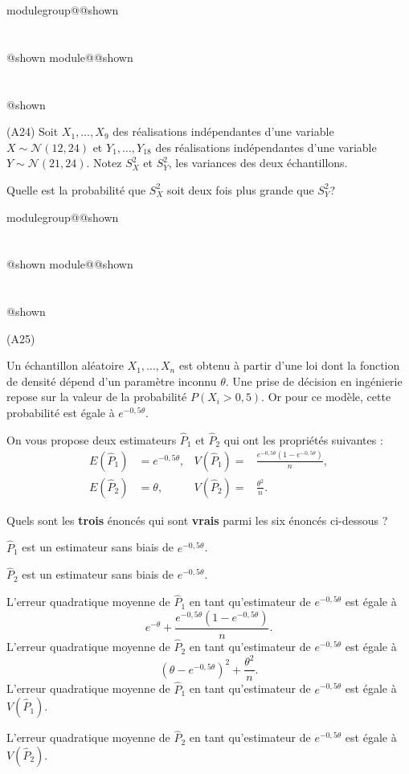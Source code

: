 \documentclass{Evaluation}
\makeatletter
\newcommand{\currentmodulekey}{}
\newcommand{\currentmoduletitle}{}
\newcommand{\currentgroupkey}{}
\newcommand{\currentgrouptitle}{}
\newcommand{\showmoduleifneeded}{%
  \ifx\currentgroupkey\empty\else
    \expandafter\ifx\csname modulegroup@\currentgroupkey @shown\endcsname\relax
      \section*{\currentgrouptitle}%
      \expandafter\gdef\csname modulegroup@\currentgroupkey @shown\endcsname{1}%
    \fi
  \fi
  \expandafter\ifx\csname module@\currentmodulekey @shown\endcsname\relax
    \section*{\currentmoduletitle}%
    \expandafter\gdef\csname module@\currentmodulekey @shown\endcsname{1}%
  \fi
}
\newenvironment{A24}{\showmoduleifneeded}{}
\newenvironment{A25}{\showmoduleifneeded}{}
\makeatother
\begin{document}
\begin{questions}
\begin{A24}
\question (A24)  
Soit $X_1,\hdots,X_9$ des réalisations indépendantes d'une variable $X\sim\mathcal{N}(12, 24)$ et $Y_1,\hdots,Y_{18}$ des réalisations indépendantes d'une variable $Y\sim\mathcal{N}(21, 24)$. 
Notez $S_X^2$ et $S_Y^2$, les variances des deux échantillons.

Quelle est la probabilité que $S_X^2$ soit deux fois plus grande que $S_Y^2$?
\end{A24}

\begin{A25}
\question (A25)

Un échantillon aléatoire $X_1,\dots,X_n$ est obtenu à partir d'une loi dont la fonction
de densité dépend d'un paramètre inconnu $\theta$. Une prise de décision en ingénierie
repose sur la valeur de la probabilité $P(X_i>0,5)$. Or pour ce modèle, 
cette probabilité est égale à $e^{-0,5\theta}$.

On vous propose deux estimateurs $\hat{P}_1$ et $\hat{P}_2$ qui ont les propriétés suivantes :
\begin{align*}
    E(\hat{P}_1)&= e^{-0,5\theta},&  V(\hat{P}_1) =& \frac{e^{-0,5\theta}\left(1-e^{-0,5\theta}\right)}{n}, \\
    E(\hat{P}_2) &= \theta,&  V(\hat{P}_2) =&\frac{\theta^2}{n} .
\end{align*}

Quels sont les \textbf{trois} énoncés qui sont \textbf{vrais} parmi les six énoncés ci-dessous ?

\begin{checkboxes}
    \correctchoice $\hat{P}_1$ est un estimateur sans biais de $e^{-0,5\theta}$.
 
\choice $\hat{P}_2$ est un estimateur sans biais de $e^{-0,5\theta}$.

\choice L'erreur quadratique moyenne de $\hat{P}_1$ en tant qu'estimateur de $e^{-0,5\theta}$ est égale à 
$$e^{-\theta}+\frac{e^{-0,5\theta}\left(1-e^{-0,5\theta}\right)}{n}.$$
    \correctchoice L'erreur quadratique moyenne de $\hat{P}_2$ en tant qu'estimateur de $e^{-0,5\theta}$
est égale à 
$$\left(\theta-e^{-0,5\theta}\right)^2+\frac{\theta^2}{n}.$$
\correctchoice L'erreur quadratique moyenne de $\hat{P}_1$ en tant qu'estimateur de $e^{-0,5\theta}$ est égale à 
$V(\hat{P}_1)$.

\choice L'erreur quadratique moyenne de $\hat{P}_2$ en tant qu'estimateur de $e^{-0,5\theta}$ est égale à 
$V(\hat{P}_2)$.
\end{checkboxes}
\end{A25}


\end{questions}
\end{document}
